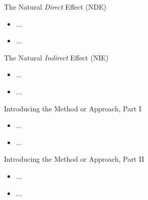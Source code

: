 \documentclass[12pt,t,handout]{beamer}
\begin{document}
\begin{frame}[c]{The Natural \textit{Direct} Effect (NDE)}

\begin{center}
\begin{itemize}
  \item ...
  \item ...
\end{itemize}
\end{center}


\end{frame}



\begin{frame}[c]{The Natural \textit{Indirect} Effect (NIE)}

\begin{center}
\begin{itemize}
  \item ...
  \item ...
\end{itemize}
\end{center}


\end{frame}



\begin{frame}[c]{Introducing the Method or Approach, Part I}

\begin{center}
\begin{itemize}
  \item ...
  \item ...
\end{itemize}
\end{center}


\end{frame}



\begin{frame}[c]{Introducing the Method or Approach, Part II}

\begin{center}
\begin{itemize}
  \item ...
  \item ...
\end{itemize}
\end{center}


\end{frame}
\end{document}
